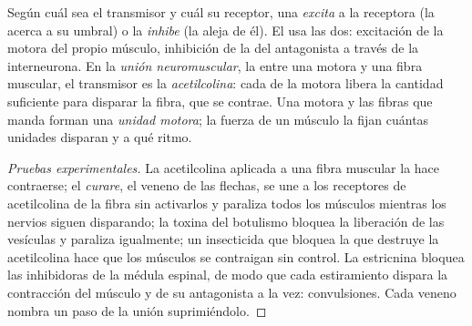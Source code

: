 \begin{proposition}\label{prop:g12:stretch-reflex:junction}
Según cuál sea el transmisor y cuál su receptor, una 
\emph{excita} a la  receptora (la acerca a su umbral) o la
\emph{inhibe} (la aleja de él). El  usa las dos:
excitación de la  motora del propio músculo, inhibición de la
del antagonista a través de la interneurona. En la \emph{unión
neuromuscular}, la  entre una  motora y una fibra
muscular, el transmisor es la \emph{acetilcolina}: cada  de la  motora libera la cantidad suficiente para
disparar la fibra, que se contrae. Una  motora y las fibras que
manda forman una \emph{unidad motora}; la fuerza de un músculo la
fijan cuántas unidades disparan y a qué ritmo.
\end{proposition}
\begin{proof}[Pruebas experimentales]
La acetilcolina aplicada a una fibra muscular la hace contraerse; el
\emph{curare}, el veneno de las flechas, se une a los receptores de
acetilcolina de la fibra sin activarlos y paraliza todos los músculos
mientras los nervios siguen disparando; la toxina del botulismo
bloquea la liberación de las vesículas y paraliza igualmente; un
insecticida que bloquea la  que destruye la acetilcolina hace que
los músculos se contraigan sin control. La estricnina bloquea las
 inhibidoras de la médula espinal, de modo que cada
estiramiento dispara la contracción del músculo y de su antagonista a
la vez: convulsiones. Cada veneno nombra un paso de la unión
suprimiéndolo.
\end{proof}

